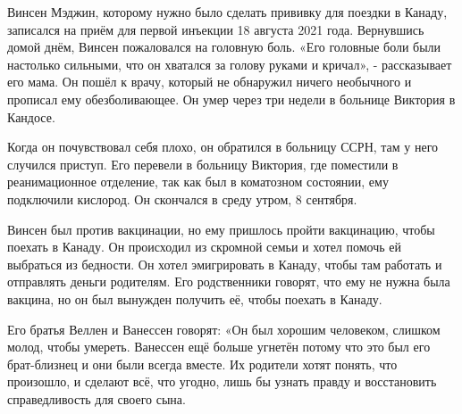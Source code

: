 Винсен Мэджин, которому нужно было сделать прививку для поездки в Канаду,
записался на приём для первой инъекции 18 августа 2021 года. Вернувшись домой
днём, Винсен пожаловался на головную боль. «Его головные боли были настолько
сильными, что он хватался за голову руками и кричал», - рассказывает его
мама. Он пошёл к врачу, который не обнаружил ничего необычного и прописал ему
обезболивающее. Он умер через три недели в больнице Виктория в Кандосе.

Когда он почувствовал себя плохо, он обратился в больницу ССРН, там у него
случился приступ. Его перевели в больницу Виктория, где поместили в
реанимационное отделение, так как был в коматозном состоянии, ему подключили
кислород. Он скончался в среду утром, 8 сентября.

Винсен был против вакцинации, но ему пришлось пройти вакцинацию, чтобы поехать в
Канаду. Он происходил из скромной семьи и хотел помочь ей выбраться из
бедности. Он хотел эмигрировать в Канаду, чтобы там работать и отправлять деньги
родителям. Его родственники говорят, что ему не нужна была вакцина, но он был
вынужден получить её, чтобы поехать в Канаду.

Его братья Веллен и Ванессен говорят: «Он был хорошим человеком, слишком молод,
чтобы умереть. Ванессен ещё больше угнетён потому что это был его брат-близнец и
они были всегда вместе. Их родители хотят понять, что произошло, и сделают всё,
что угодно, лишь бы узнать правду и восстановить справедливость для своего сына.
